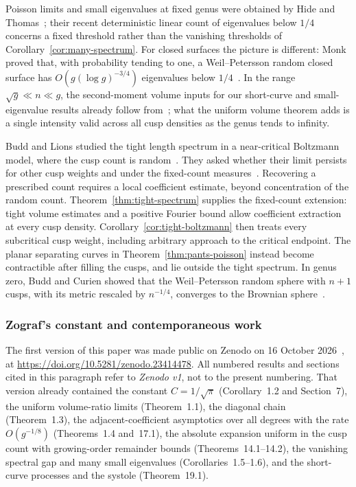 Poisson limits and small eigenvalues at fixed genus were obtained by Hide and Thomas~\cite{HTSphere,HTLargeN}; their recent deterministic linear count of eigenvalues below $1/4$~\cite{HTMany} concerns a fixed threshold rather than the vanishing thresholds of Corollary~\ref{cor:many-spectrum}. For closed surfaces the picture is different: Monk proved that, with probability tending to one, a Weil--Petersson random closed surface has $O(g(\log g)^{-3/4})$ eigenvalues below $1/4$~\cite[Theorem~4]{Monk}. In the range $\sqrt g\ll n\ll g$, the second-moment volume inputs for our short-curve and small-eigenvalue results already follow from~\cite{SW}; what the uniform volume theorem adds is a single intensity valid across all cusp densities as the genus tends to infinity.

Budd and Lions studied the tight length spectrum in a near-critical Boltzmann model, where the cusp count is random~\cite{BL}. They asked whether their limit persists for other cusp weights and under the fixed-count measures~\cite[Open Question~1.6]{BL}. Recovering a prescribed count requires a local coefficient estimate, beyond concentration of the random count. Theorem~\ref{thm:tight-spectrum} supplies the fixed-count extension: tight volume estimates and a positive Fourier bound allow coefficient extraction at every cusp density. Corollary~\ref{cor:tight-boltzmann} then treats every subcritical cusp weight, including arbitrary approach to the critical endpoint. The planar separating curves in Theorem~\ref{thm:pants-poisson} instead become contractible after filling the cusps, and lie outside the tight spectrum. In genus zero, Budd and Curien showed that the Weil--Petersson random sphere with $n+1$ cusps, with its metric rescaled by $n^{-1/4}$, converges to the Brownian sphere~\cite{BC}.

\subsubsection{Zograf's constant and contemporaneous work}
The first version of this paper was made public on Zenodo on 16 October 2026~\cite{LWZenodo}, at \url{https://doi.org/10.5281/zenodo.23414478}. All numbered results and sections cited in this paragraph refer to \emph{Zenodo v1}, not to the present numbering. That version already contained the constant $C=1/\sqrt\pi$ (Corollary~1.2 and Section~7), the uniform volume-ratio limits (Theorem~1.1), the diagonal chain (Theorem~1.3), the adjacent-coefficient asymptotics over all degrees with the rate $O(g^{-1/8})$ (Theorems~1.4 and~17.1), the absolute expansion uniform in the cusp count with growing-order remainder bounds (Theorems~14.1--14.2), the vanishing spectral gap and many small eigenvalues (Corollaries~1.5--1.6), and the short-curve processes and the systole (Theorem~19.1).

